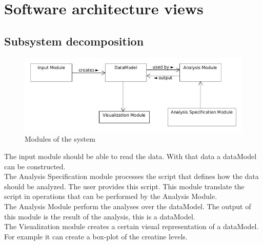 \documentclass[a4paper]{article}
\begin{document}
\section{Software architecture views}
\subsection{Subsystem decomposition}

\begin{figure}[h]
	\centering
    	\includegraphics[scale=0.5]{images/modules.jpg}
    \caption{Modules of the system}
	\label{fig:modules}
\end{figure}

The input module should be able to read the data. With that data a dataModel
can be constructed. \\
The Analysis Specification module processes the script that defines how the
data should be analyzed. The user provides this script. This module translate
the script in operations that can be performed by the Analysis Module.\\
The Analysis Module perform the analyses over the dataModel. The output of this
module is the result of the analysis, this is a dataModel.\\
The Visualization module creates a certain visual representation of a
dataModel. For example it can create a box-plot of the creatine levels.
\end{document}
